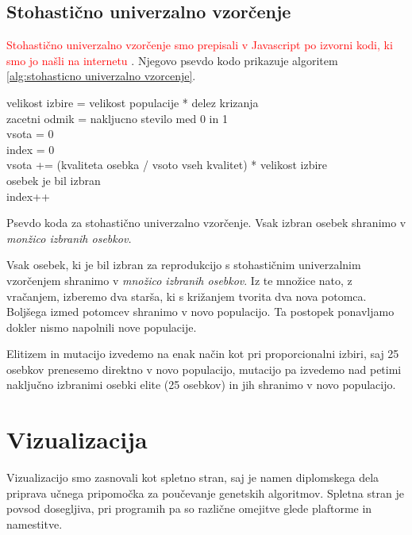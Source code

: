 \documentclass[a4paper, 12pt]{book}
\begin{document}
\subsection{Stohasti\v cno univerzalno vzor\v cenje}
\textcolor{red}{Stohasti\v cno univerzalno vzor\v cenje smo prepisali v Javascript po izvorni kodi, ki smo jo na\v sli na internetu}
\cite{github-stohasticno}. Njegovo psevdo kodo prikazuje algoritem \ref{alg:stohasticno univerzalno vzorcenje}.

\begin{algorithm}
\SetAlgoLined

velikost izbire = velikost populacije * delez krizanja\\
zacetni odmik = nakljucno stevilo med 0 in 1\\
vsota = 0\\
index = 0\\
{
	vsota += (kvaliteta osebka / vsoto vseh kvalitet) * velikost izbire\\
	{
		osebek je bil izbran\\
		index++
	}
}
\caption{Psevdo koda za stohasti\v cno univerzalno vzor\v cenje. Vsak izbran osebek shranimo v \textit{mon\v zico izbranih osebkov.}}
\label{alg:stohasticno univerzalno vzorcenje}
\end{algorithm}

Vsak osebek, ki je bil izbran za reprodukcijo s stohasti\v cnim univerzalnim vzor\v cenjem shranimo v \textit{mno\v zico izbranih osebkov}. Iz te mno\v zice nato, z vra\v canjem, izberemo dva star\v sa, ki s kri\v zanjem tvorita dva nova potomca. Bolj\v sega izmed potomcev shranimo v novo populacijo. Ta postopek ponavljamo dokler nismo napolnili nove populacije.

Elitizem in mutacijo izvedemo na enak na\v cin kot pri proporcionalni izbiri, saj 25 osebkov prenesemo direktno v novo populacijo, mutacijo pa izvedemo nad petimi naklju\v cno izbranimi osebki elite (25 osebkov) in jih shranimo v novo populacijo.
 
\section{Vizualizacija}
Vizualizacijo smo zasnovali kot spletno stran, saj je namen diplomskega dela priprava u\v cnega pripomo\v cka za pou\v cevanje genetskih algoritmov. Spletna stran je povsod dosegljiva, pri programih pa so razli\v cne omejitve glede plaftorme in namestitve. 
\end{document}

